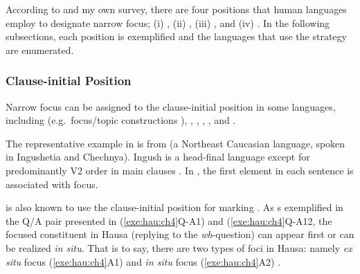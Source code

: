 According to \citet{fery:krifka:08} and my own survey, there are four
positions that human languages employ to designate narrow focus; (i)
, (ii) , (iii) ,
and (iv) . In the following subsections, each position
is exemplified and the languages that use the strategy are enumerated.


\subsubsection{Clause-initial Position}
\label{4:sssec:clause-initial}


Narrow focus can be assigned to the clause-initial position in some
languages, including  (e.g.\ focus/topic 
constructions \citep{prince:84}),  \citep{nichols:11},
 \citep{drubig:03},  \citep{press:86},
 \citep{jacobs:05}, and 
\citep{hartmann:zimmermann:07,buring:10}.



The representative example in  is from
 (a Northeast Caucasian language, spoken in Ingushetia and
Chechnya).  Ingush is a head-final language except for predominantly
V2 order in main clauses \citep{nichols:11}. In ,
the first element in each sentence is associated with focus.



 is also known to use the clause-initial position for
marking  \citep{buring:10}. As s exemplified in the Q/A pair
presented in (\ref{exe:hau:ch4}Q-A1) and (\ref{exe:hau:ch4}Q-A12, the
focused constituent in Hausa (replying to the \textit{wh}-question)
can appear first or can be realized \textit{in situ}.  That is to say,
there are two types of foci in Hausa: namely \textit{ex situ} focus
(\ref{exe:hau:ch4}A1) and \textit{in situ} focus (\ref{exe:hau:ch4}A2)
\citep{hartmann:zimmermann:07}.

